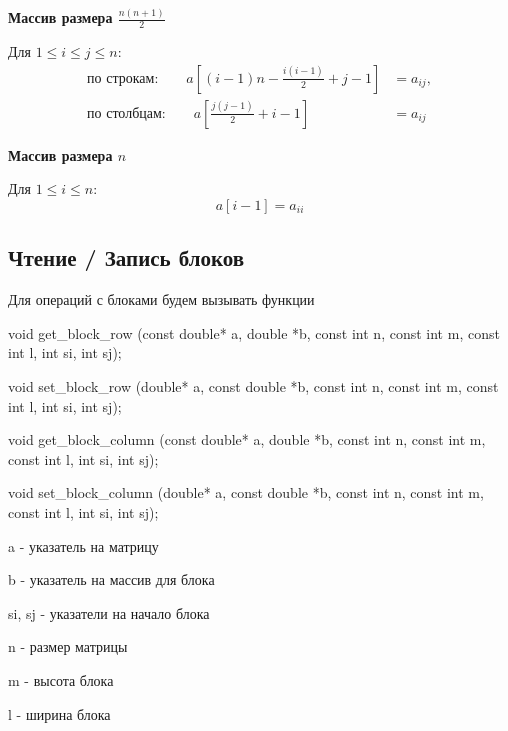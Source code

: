 \documentclass[a4paper,12pt]{article}
\begin{document}
\medskip
\noindent
\textbf{Массив размера $\frac{n(n+1)}{2}$}

Для $1 \leq i \leq j \leq n$:
$$
\begin{aligned}
  \text{по строкам:}\qquad
  a\left[(i-1)n-\frac{i(i-1)}{2}+j-1\right]
  &= a_{ij}, \\
  \text{по столбцам:}\qquad
  a\left[\frac{j(j-1)}{2}+i-1\right]
  &= a_{ij}
\end{aligned}
$$

\medskip
\noindent
\textbf{Массив размера $n$}

Для $1 \leq i \leq n$:
$$
a[i-1] = a_{ii}
$$

\subsection{Чтение / Запись блоков}

Для операций с блоками будем вызывать функции

void get\_block\_row (const double* a, double *b, const int n, const int m, const int l, int si, int sj);

void set\_block\_row (double* a, const double *b, const int n, const int m, const int l, int si, int sj);

void get\_block\_column (const double* a, double *b, const int n, const int m, const int l, int si, int sj);

void set\_block\_column (double* a, const double *b, const int n, const int m, const int l, int si, int sj);

a - указатель на матрицу

b - указатель на массив для блока

si, sj - указатели на начало блока

n - размер матрицы

m - высота блока

l - ширина блока
\end{document}
